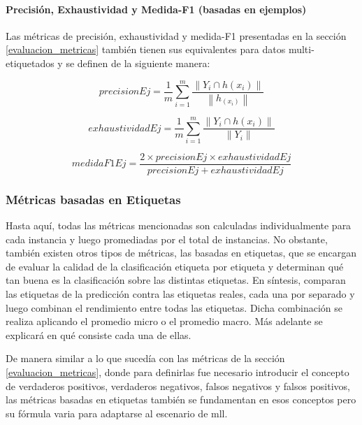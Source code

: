 \paragraph{Precisión, Exhaustividad y Medida-F1 (basadas en ejemplos)}

Las métricas de precisión, exhaustividad y medida-F1 presentadas en la sección
\ref{evaluacion_metricas} también tienen sus equivalentes para datos
multi-etiquetados y se definen de la siguiente manera:

\begin{equation}
	precisionEj = \frac{1}{m} \sum_{i=1}^{m}
	\frac{\left\|Y_{i} \cap h(x_{i})\right\|}
	{\left\|h_(x_{i})\right\|}
\end{equation}

\begin{equation}
	exhaustividadEj = \frac{1}{m} \sum_{i=1}^{m}
	\frac{\left\|Y_{i} \cap h(x_{i})\right\|}
	{\left\|Y_{i}\right\|}
\end{equation}

\begin{equation}
	medidaF1Ej = \frac{2 \times precisionEj \times exhaustividadEj}{ precisionEj +
		exhaustividadEj }
\end{equation}


\subsubsection{Métricas basadas en Etiquetas}

Hasta aquí, todas las métricas mencionadas son calculadas individualmente para
cada instancia y luego promediadas por el total de instancias. No obstante,
también existen otros tipos de métricas, las basadas en etiquetas, que se
encargan de evaluar la calidad de la clasificación etiqueta por etiqueta y
determinan qué tan buena es la clasificación sobre las distintas etiquetas.  En
síntesis, comparan las etiquetas de la predicción contra las etiquetas reales,
cada una por separado y luego combinan el rendimiento entre todas las etiquetas.
Dicha combinación se realiza aplicando el promedio micro o el promedio macro.
Más adelante se explicará en qué consiste cada una de ellas.

De manera similar a lo que sucedía con las métricas de la sección
\ref{evaluacion_metricas}, donde para definirlas fue necesario introducir el
concepto de verdaderos positivos, verdaderos negativos, falsos negativos y
falsos positivos, las métricas basadas en etiquetas también se fundamentan en
esos conceptos pero su fórmula varia para adaptarse al escenario de
\acrshort{mll}.

